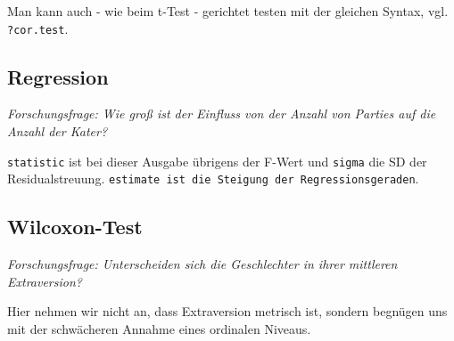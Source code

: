 \documentclass[12pt,ngerman,]{book}
\makeatletter
\newenvironment{Shaded}{\begin{snugshade}}{\end{snugshade}}
\newcommand{\KeywordTok}[1]{\textcolor[rgb]{0.13,0.29,0.53}{\textbf{#1}}}
\newcommand{\DataTypeTok}[1]{\textcolor[rgb]{0.13,0.29,0.53}{#1}}
\newcommand{\StringTok}[1]{\textcolor[rgb]{0.31,0.60,0.02}{#1}}
\newcommand{\CommentTok}[1]{\textcolor[rgb]{0.56,0.35,0.01}{\textit{#1}}}
\newcommand{\OperatorTok}[1]{\textcolor[rgb]{0.81,0.36,0.00}{\textbf{#1}}}
\newcommand{\NormalTok}[1]{#1}
\newenvironment{kframe}{%
\medskip{}
\setlength{\fboxsep}{.8em}
 \def\at@end@of@kframe{}%
 \ifinner\ifhmode%
  \def\at@end@of@kframe{\end{minipage}}%
  \begin{minipage}{\columnwidth}%
 \fi\fi%
 \def\FrameCommand##1{\hskip\@totalleftmargin \hskip-\fboxsep
 \colorbox{shadecolor}{##1}\hskip-\fboxsep
     \hskip-\linewidth \hskip-\@totalleftmargin \hskip\columnwidth}%
 \MakeFramed {\advance\hsize-\width
   \@totalleftmargin\z@ \linewidth\hsize
   \@setminipage}}%
 {\par\unskip\endMakeFramed%
 \at@end@of@kframe}
\renewenvironment{Shaded}{\begin{kframe}}{\end{kframe}}
\theoremstyle{definition}
\theoremstyle{definition}
\theoremstyle{remark}
\makeatother
\begin{document}
Man kann auch - wie beim t-Test - gerichtet testen mit der gleichen
Syntax, vgl. \texttt{?cor.test}.

\subsection{Regression}\label{regression}

\emph{Forschungsfrage: Wie groß ist der Einfluss von der Anzahl von
Parties auf die Anzahl der Kater?}

\begin{Shaded}
\end{Shaded}

\texttt{statistic} ist bei dieser Ausgabe übrigens der F-Wert und
\texttt{sigma} die SD der Residualstreuung.
\texttt{estimate\ ist\ die\ Steigung\ der\ Regressionsgeraden}.

\subsection{Wilcoxon-Test}\label{wilcoxon-test}

\emph{Forschungsfrage: Unterscheiden sich die Geschlechter in ihrer
mittleren Extraversion?}

Hier nehmen wir nicht an, dass Extraversion metrisch ist, sondern
begnügen uns mit der schwächeren Annahme eines ordinalen Niveaus.
\end{document}
